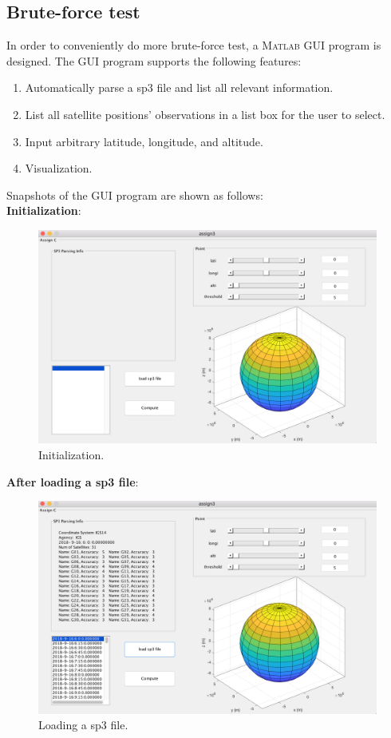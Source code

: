 \subsection{Brute-force test}
In order to conveniently do more brute-force test, a \textsc{Matlab} GUI program is designed. The GUI program supports the following features:
\begin{enumerate}
	\item Automatically parse a sp3 file and list all relevant information.
	\item List all satellite positions' observations in a list box for the user to select.
	\item Input arbitrary latitude, longitude, and altitude.
	\item Visualization.
\end{enumerate}
Snapshots of the GUI program are shown as follows: \\
\textbf{Initialization}: \\
\begin{figure}[h]
	\centering
	\includegraphics[width=\textwidth]{figures/ex3init}
	\caption{Initialization.}
\end{figure}
\textbf{After loading a sp3 file}: \\
\begin{figure}[h]
	\centering
	\includegraphics[width=\textwidth]{figures/ex3loadsp3}
	\caption{Loading a sp3 file.}
\end{figure}
